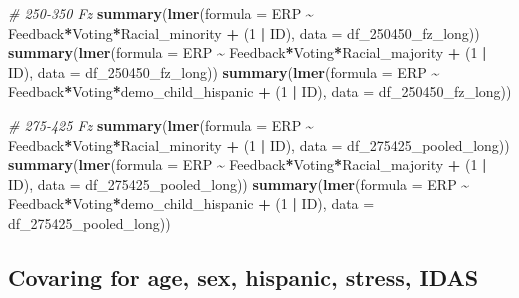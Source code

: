 \documentclass[
]{article}
\newenvironment{Shaded}{\begin{snugshade}}{\end{snugshade}}
\newcommand{\AttributeTok}[1]{\textcolor[rgb]{0.13,0.29,0.53}{#1}}
\newcommand{\CommentTok}[1]{\textcolor[rgb]{0.56,0.35,0.01}{\textit{#1}}}
\newcommand{\DecValTok}[1]{\textcolor[rgb]{0.00,0.00,0.81}{#1}}
\newcommand{\FunctionTok}[1]{\textcolor[rgb]{0.13,0.29,0.53}{\textbf{#1}}}
\newcommand{\NormalTok}[1]{#1}
\newcommand{\SpecialCharTok}[1]{\textcolor[rgb]{0.81,0.36,0.00}{\textbf{#1}}}
\begin{document}
\begin{Shaded}
\begin{Highlighting}[]
\CommentTok{\# 250{-}350 Fz}
\FunctionTok{summary}\NormalTok{(}\FunctionTok{lmer}\NormalTok{(}\AttributeTok{formula =}\NormalTok{ ERP }\SpecialCharTok{\textasciitilde{}}\NormalTok{ Feedback}\SpecialCharTok{*}\NormalTok{Voting}\SpecialCharTok{*}\NormalTok{Racial\_minority }\SpecialCharTok{+}\NormalTok{ (}\DecValTok{1} \SpecialCharTok{|}\NormalTok{ ID), }\AttributeTok{data =}\NormalTok{ df\_250450\_fz\_long))}
\FunctionTok{summary}\NormalTok{(}\FunctionTok{lmer}\NormalTok{(}\AttributeTok{formula =}\NormalTok{ ERP }\SpecialCharTok{\textasciitilde{}}\NormalTok{ Feedback}\SpecialCharTok{*}\NormalTok{Voting}\SpecialCharTok{*}\NormalTok{Racial\_majority }\SpecialCharTok{+}\NormalTok{ (}\DecValTok{1} \SpecialCharTok{|}\NormalTok{ ID), }\AttributeTok{data =}\NormalTok{ df\_250450\_fz\_long))}
\FunctionTok{summary}\NormalTok{(}\FunctionTok{lmer}\NormalTok{(}\AttributeTok{formula =}\NormalTok{ ERP }\SpecialCharTok{\textasciitilde{}}\NormalTok{ Feedback}\SpecialCharTok{*}\NormalTok{Voting}\SpecialCharTok{*}\NormalTok{demo\_child\_hispanic }\SpecialCharTok{+}\NormalTok{ (}\DecValTok{1} \SpecialCharTok{|}\NormalTok{ ID), }\AttributeTok{data =}\NormalTok{ df\_250450\_fz\_long))}

\CommentTok{\# 275{-}425 Fz}
\FunctionTok{summary}\NormalTok{(}\FunctionTok{lmer}\NormalTok{(}\AttributeTok{formula =}\NormalTok{ ERP }\SpecialCharTok{\textasciitilde{}}\NormalTok{ Feedback}\SpecialCharTok{*}\NormalTok{Voting}\SpecialCharTok{*}\NormalTok{Racial\_minority }\SpecialCharTok{+}\NormalTok{ (}\DecValTok{1} \SpecialCharTok{|}\NormalTok{ ID), }\AttributeTok{data =}\NormalTok{ df\_275425\_pooled\_long))}
\FunctionTok{summary}\NormalTok{(}\FunctionTok{lmer}\NormalTok{(}\AttributeTok{formula =}\NormalTok{ ERP }\SpecialCharTok{\textasciitilde{}}\NormalTok{ Feedback}\SpecialCharTok{*}\NormalTok{Voting}\SpecialCharTok{*}\NormalTok{Racial\_majority }\SpecialCharTok{+}\NormalTok{ (}\DecValTok{1} \SpecialCharTok{|}\NormalTok{ ID), }\AttributeTok{data =}\NormalTok{ df\_275425\_pooled\_long))}
\FunctionTok{summary}\NormalTok{(}\FunctionTok{lmer}\NormalTok{(}\AttributeTok{formula =}\NormalTok{ ERP }\SpecialCharTok{\textasciitilde{}}\NormalTok{ Feedback}\SpecialCharTok{*}\NormalTok{Voting}\SpecialCharTok{*}\NormalTok{demo\_child\_hispanic }\SpecialCharTok{+}\NormalTok{ (}\DecValTok{1} \SpecialCharTok{|}\NormalTok{ ID), }\AttributeTok{data =}\NormalTok{ df\_275425\_pooled\_long))}
\end{Highlighting}
\end{Shaded}

\hypertarget{covaring-for-age-sex-hispanic-stress-idas}{%
\subsection{Covaring for age, sex, hispanic, stress,
IDAS}\label{covaring-for-age-sex-hispanic-stress-idas}}
\end{document}
